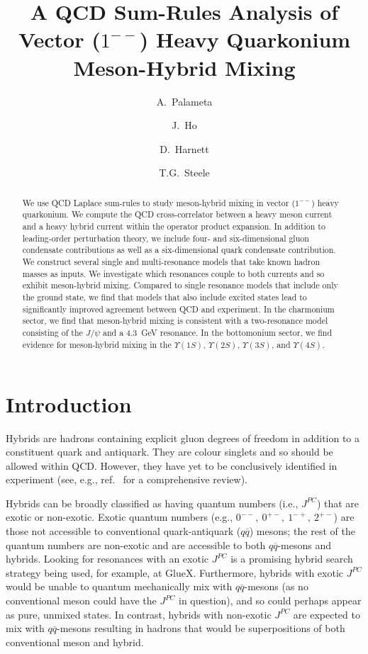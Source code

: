 \documentclass[11pt, letterpaper]{article}
\title{A QCD Sum-Rules Analysis of Vector ($1^{--}$)  Heavy Quarkonium Meson-Hybrid Mixing}
\author[1]{A.\ Palameta}
\author[1]{J.\ Ho}
\author[2]{D.\ Harnett}
\author[1]{T.G.\ Steele}
\affil[1]{Department of Physics and Engineering Physics\\ University of Saskatchewan\\           Saskatoon, SK, S7N 5E2, Canada}
\affil[2]{Department of Physics\\ University of the Fraser Valley\\ Abbotsford, BC, V2S 7M8, Canada}
\begin{document}
\maketitle
\begin{abstract}
\noindent We use QCD Laplace sum-rules to study meson-hybrid mixing in vector ($1^{--}$) heavy quarkonium. We compute the QCD cross-correlator between a heavy meson current and a heavy hybrid current within the operator product expansion. In addition to leading-order perturbation theory, we include four- and six-dimensional gluon condensate contributions as well as a six-dimensional quark condensate contribution. We construct several single and multi-resonance models that take known hadron masses as inputs.  We investigate which resonances couple to both currents and so exhibit meson-hybrid mixing. Compared to single resonance models that include only the ground state, we find that models that also include excited states lead to significantly improved agreement between QCD and experiment. In the charmonium sector, we find that meson-hybrid mixing is consistent with a two-resonance model consisting of the $J/\psi$ and a 4.3~GeV resonance. In the bottomonium sector, we find evidence for meson-hybrid mixing in the $\Upsilon(1S)$, $\Upsilon(2S)$, $\Upsilon(3S)$, and $\Upsilon(4S)$. 
\end{abstract}

\section{Introduction}\label{I}
Hybrids are hadrons containing explicit gluon degrees of freedom in addition 
to a constituent quark and antiquark.
They are colour singlets and so should be allowed within QCD.
However, they have yet to be conclusively identified in experiment
(see, e.g., ref.~\cite{Meyer:2015eta} for a comprehensive review).

Hybrids can be broadly classified as having quantum numbers (i.e., $J^{PC}$) 
that are exotic or non-exotic.
Exotic quantum numbers (e.g., $0^{--},\ 0^{+-},\ 1^{-+},\ 2^{+-}$) are those 
not accessible to conventional quark-antiquark ($q\overline{q}$) mesons;
the rest of the quantum numbers are non-exotic and are accessible to both $q\overline{q}$-mesons and hybrids.
Looking for resonances with an exotic $J^{PC}$ is a promising hybrid search strategy
being used, for example, at GlueX.
Furthermore, hybrids with exotic $J^{PC}$ would be unable to quantum mechanically
mix with $q\overline{q}$-mesons (as no conventional meson could have the $J^{PC}$ in question),
and so could perhaps appear as pure, unmixed states.
In contrast, hybrids with non-exotic $J^{PC}$ are expected to mix with $q\overline{q}$-mesons
resulting in hadrons that would be superpositions of both conventional meson and hybrid.
\end{document}
